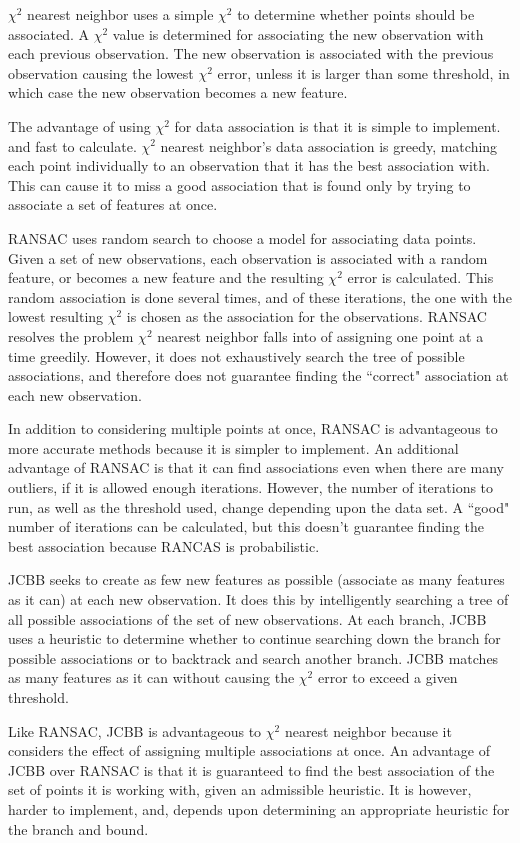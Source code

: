 \documentclass[12pt]{article}
\begin{document}
	$\chi^2$ nearest neighbor uses a simple $\chi^2$ to determine whether points
should be associated.  A $\chi^2$ value is determined for associating the new observation
with each previous observation.  The new observation is associated with the previous
observation causing the lowest $\chi^2$ error, unless it is larger than some threshold,
in which case the new observation becomes a new feature.  

	The advantage of using $\chi^2$ for data association is that it is simple to implement.
and fast to calculate.  $\chi^2$ nearest neighbor's data association is greedy, matching 
each point individually to an observation that it has the best association with.  This can 
cause it to miss a good association that is found only by trying to associate a set of features
 at once.

	RANSAC uses random search to choose a model for associating data points.  Given
a set of new observations, each observation is associated with a random feature, or 
becomes a new feature and the resulting $\chi^2$ error is calculated.  This random
association is done several times, and of these iterations, the one with the lowest 
resulting $\chi^2$ is chosen as the association for the observations.  RANSAC resolves
the problem $\chi^2$ nearest neighbor falls into of assigning one point at a time greedily.
However, it does not exhaustively search the tree of possible associations, and therefore
does not guarantee finding the ``correct" association at each new observation.
	
	In addition to considering multiple points at once, RANSAC is advantageous to more
accurate methods because it is simpler to implement.  An additional advantage of RANSAC
is that it can find associations even when there are many outliers, if it is allowed enough
iterations.  However, the number of iterations to run, as well as the threshold used, change
depending upon the data set.  A ``good" number of iterations can be calculated, but this doesn't 
guarantee finding the best association because RANCAS is probabilistic.

	JCBB seeks to create as few new features as possible (associate as many features
as it can) at each new observation.  It does this by intelligently searching a tree of all
possible associations of the set of new observations.  At each branch, JCBB uses a
heuristic to determine whether to continue searching down the branch for possible
associations or to backtrack and search another branch.  JCBB matches as many features
as it can without causing the $\chi^2$ error to exceed a given threshold.  

	Like RANSAC, JCBB is advantageous to $\chi^2$ nearest neighbor because it 
considers the effect of assigning multiple associations at once.  An advantage of JCBB
over RANSAC is that it is guaranteed to find the best association of the set of points it is
working with, given an admissible heuristic.  It is however, harder to implement, and,
depends upon determining an appropriate heuristic for the branch and bound.
\end{document}
